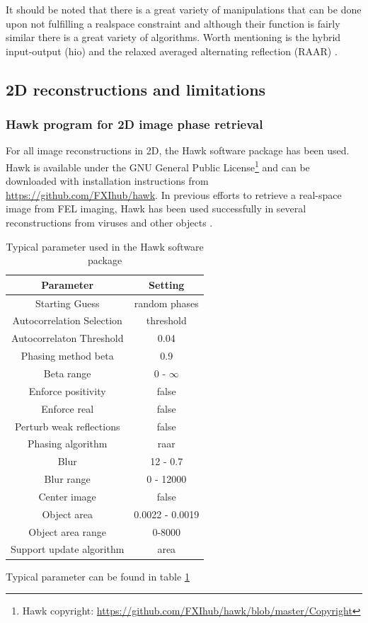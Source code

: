 It should be noted that there is a great variety of manipulations that can be done upon not fulfilling a realspace constraint and although their function is fairly similar there is a great variety of algorithms. Worth mentioning is the hybrid input-output (hio) \cite{Fienup-1978-OL} and the relaxed averaged alternating reflection (RAAR) \cite{Luke-2005-IP}.
%
%
%
%
\subsection{2D reconstructions and limitations}
%
%
%
\subsubsection{Hawk program for 2D image phase retrieval}
For all image reconstructions in 2D, the Hawk software package \citep{Maia-2010-JAC} has been used. Hawk is available under the GNU General Public License\footnote{Hawk copyright: \url{https://github.com/FXIhub/hawk/blob/master/Copyright}} and can be downloaded with installation instructions from \url{https://github.com/FXIhub/hawk}. In previous efforts to retrieve a real-space image from FEL imaging, Hawk has been used successfully in several reconstructions from viruses \citep{Seibert-2011-Nature,Ekeberg-2015-PRL} and other objects \citep{Seibert-2010-JPhysB}.
\begin{table}%
\centering
\begin{tabular}{ |c|c|}
 \hline
 \textbf{Parameter} & \textbf{Setting} \\ 
 \hline
 Starting Guess & random phases \\ \hline
 Autocorrelation Selection & threshold \\ \hline
 Autocorrelaton Threshold & 0.04  \\ \hline
 Phasing method beta & 0.9  \\ \hline
 Beta range & 0 - $\infty$ \\ \hline
 Enforce positivity & false   \\ \hline
 Enforce real & false     \\\hline
Perturb weak reflections & false \\ \hline
Phasing algorithm & raar \\ \hline
Blur & 12 - 0.7 \\ \hline
Blur range & 0 - 12000 \\ \hline
Center image & false \\ \hline
Object area & 0.0022 - 0.0019 \\ \hline
Object area range & 0-8000\\ \hline
Support update algorithm & area \\ \hline
\end{tabular}
\caption{Typical parameter used in the Hawk software package}
\label{tab:hawk-parameter}
\end{table}
Typical parameter can be found in table \ref{tab:hawk-parameter}
%
%
%
